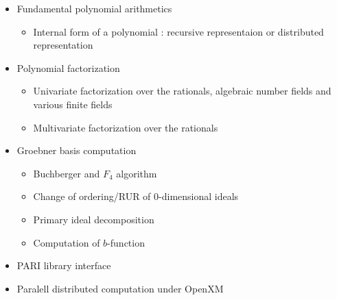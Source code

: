 \begin{slide}{}

\begin{itemize}
\item Fundamental polynomial arithmetics

\begin{itemize}
\item Internal form of a polynomial : recursive representaion or distributed
representation
\end{itemize}

\item Polynomial factorization

\begin{itemize}
\item Univariate factorization over the rationals, algebraic number fields and various finite fields

\item Multivariate factorization over the rationals
\end{itemize}

\item Groebner basis computation

\begin{itemize}
\item Buchberger and $F_4$ algorithm

\item Change of ordering/RUR of 0-dimensional ideals

\item Primary ideal decomposition

\item Computation of $b$-function
\end{itemize}

\item PARI library interface 

\item Paralell distributed computation under OpenXM 
\end{itemize}
\end{slide}

